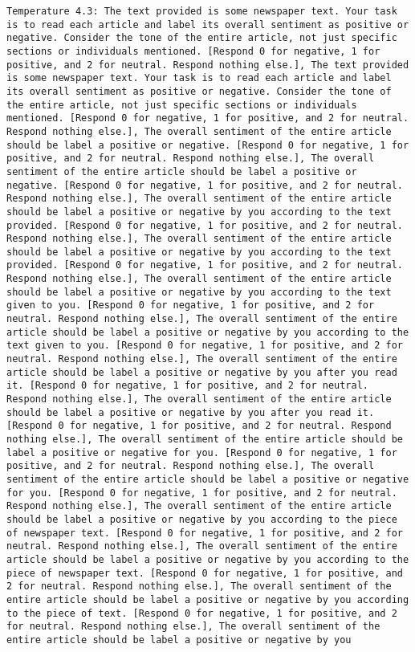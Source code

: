 \begin{lstlisting}[label=lst:poor_performing_prompts]
	Temperature 4.3: The text provided is some newspaper text. Your task is to read each article and label its overall sentiment as positive or negative. Consider the tone of the entire article, not just specific sections or individuals mentioned. [Respond 0 for negative, 1 for positive, and 2 for neutral. Respond nothing else.], The text provided is some newspaper text. Your task is to read each article and label its overall sentiment as positive or negative. Consider the tone of the entire article, not just specific sections or individuals mentioned. [Respond 0 for negative, 1 for positive, and 2 for neutral. Respond nothing else.], The overall sentiment of the entire article should be label a positive or negative. [Respond 0 for negative, 1 for positive, and 2 for neutral. Respond nothing else.], The overall sentiment of the entire article should be label a positive or negative. [Respond 0 for negative, 1 for positive, and 2 for neutral. Respond nothing else.], The overall sentiment of the entire article should be label a positive or negative by you according to the text provided. [Respond 0 for negative, 1 for positive, and 2 for neutral. Respond nothing else.], The overall sentiment of the entire article should be label a positive or negative by you according to the text provided. [Respond 0 for negative, 1 for positive, and 2 for neutral. Respond nothing else.], The overall sentiment of the entire article should be label a positive or negative by you according to the text given to you. [Respond 0 for negative, 1 for positive, and 2 for neutral. Respond nothing else.], The overall sentiment of the entire article should be label a positive or negative by you according to the text given to you. [Respond 0 for negative, 1 for positive, and 2 for neutral. Respond nothing else.], The overall sentiment of the entire article should be label a positive or negative by you after you read it. [Respond 0 for negative, 1 for positive, and 2 for neutral. Respond nothing else.], The overall sentiment of the entire article should be label a positive or negative by you after you read it. [Respond 0 for negative, 1 for positive, and 2 for neutral. Respond nothing else.], The overall sentiment of the entire article should be label a positive or negative for you. [Respond 0 for negative, 1 for positive, and 2 for neutral. Respond nothing else.], The overall sentiment of the entire article should be label a positive or negative for you. [Respond 0 for negative, 1 for positive, and 2 for neutral. Respond nothing else.], The overall sentiment of the entire article should be label a positive or negative by you according to the piece of newspaper text. [Respond 0 for negative, 1 for positive, and 2 for neutral. Respond nothing else.], The overall sentiment of the entire article should be label a positive or negative by you according to the piece of newspaper text. [Respond 0 for negative, 1 for positive, and 2 for neutral. Respond nothing else.], The overall sentiment of the entire article should be label a positive or negative by you according to the piece of text. [Respond 0 for negative, 1 for positive, and 2 for neutral. Respond nothing else.], The overall sentiment of the entire article should be label a positive or negative by you 
\end{lstlisting}
